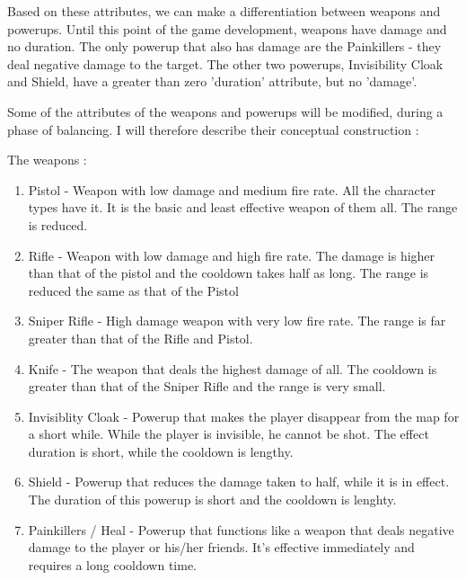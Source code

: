 \documentclass{article}
\begin{document}
Based on these attributes, we can make a differentiation between weapons and
powerups. Until this point of the game development, weapons have damage and no
duration. The only powerup that also has damage are the Painkillers - they deal
negative damage to the target. The other two powerups, Invisibility Cloak and
Shield, have a greater than zero 'duration' attribute, but no 'damage'.\newline

Some of the attributes of the weapons and powerups will be modified, during a
phase of balancing. I will therefore describe their conceptual construction : 

The weapons : 
\begin{enumerate}
  \item Pistol - Weapon with low damage and medium fire rate. All the character
  types have it. It is the basic and least effective weapon of them all. The
  range is reduced.
  \item Rifle - Weapon with low damage and high fire rate. The damage is higher
  than that of the pistol and the cooldown takes half as long. The range is
  reduced the same as that of the Pistol
  \item Sniper Rifle - High damage weapon with very low fire rate. The range is
  far greater than that of the Rifle and Pistol.
  \item Knife - The weapon that deals the highest damage of all. The cooldown is
  greater than that of the Sniper Rifle and the range is very small. 
  \item Invisiblity Cloak - Powerup that makes the player disappear from the
  map for a short while. While the player is invisible, he cannot be shot.
  The effect duration is short, while the cooldown is lengthy.
  \item Shield - Powerup that reduces the damage taken to half, while it is in
  effect. The duration of this powerup is short and the cooldown is lenghty.
  \item Painkillers / Heal - Powerup that functions like a weapon that deals
  negative damage to the player or his/her friends. It's effective immediately
  and requires a long cooldown time.
\end{enumerate}
\end{document}
